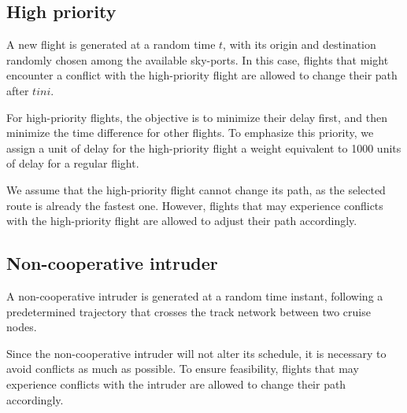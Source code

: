 \documentclass[../thesis.tex]{subfiles}
\begin{document}
\subsection{High priority}

A new flight is generated at a random time $t$, with its origin and destination randomly chosen among the available sky-ports.  
In this case, flights that might encounter a conflict with the high-priority flight are allowed to change their path after $tini$.  

For high-priority flights, the objective is to minimize their delay first, and then minimize the time difference for other flights.  
To emphasize this priority, we assign a unit of delay for the high-priority flight a weight equivalent to 1000 units of delay for a regular flight.  

We assume that the high-priority flight cannot change its path, as the selected route is already the fastest one.  
However, flights that may experience conflicts with the high-priority flight are allowed to adjust their path accordingly.

\subsection{Non-cooperative intruder}

A non-cooperative intruder is generated at a random time instant, following a predetermined trajectory that crosses the track network between two cruise nodes.  

Since the non-cooperative intruder will not alter its schedule, it is necessary to avoid conflicts as much as possible.  
To ensure feasibility, flights that may experience conflicts with the intruder are allowed to change their path accordingly.  

\end{document}
